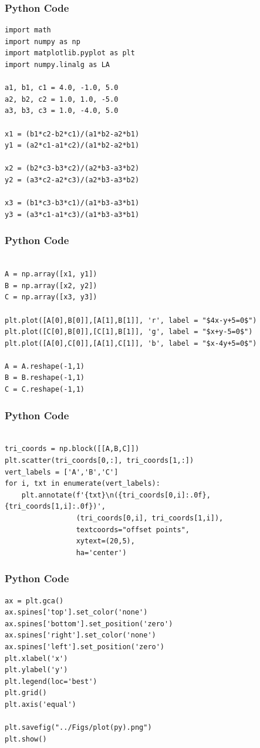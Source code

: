 \documentclass{beamer}
\begin{document}


\begin{frame}[fragile]
    \frametitle{Python Code}
    \begin{lstlisting}
import math
import numpy as np
import matplotlib.pyplot as plt
import numpy.linalg as LA

a1, b1, c1 = 4.0, -1.0, 5.0
a2, b2, c2 = 1.0, 1.0, -5.0
a3, b3, c3 = 1.0, -4.0, 5.0

x1 = (b1*c2-b2*c1)/(a1*b2-a2*b1)
y1 = (a2*c1-a1*c2)/(a1*b2-a2*b1)

x2 = (b2*c3-b3*c2)/(a2*b3-a3*b2) 
y2 = (a3*c2-a2*c3)/(a2*b3-a3*b2)

x3 = (b1*c3-b3*c1)/(a1*b3-a3*b1)
y3 = (a3*c1-a1*c3)/(a1*b3-a3*b1)

\end{lstlisting}
\end{frame}

\begin{frame}[fragile]
    \frametitle{Python Code}
    \begin{lstlisting}

A = np.array([x1, y1])
B = np.array([x2, y2])
C = np.array([x3, y3])

plt.plot([A[0],B[0]],[A[1],B[1]], 'r', label = "$4x-y+5=0$")
plt.plot([C[0],B[0]],[C[1],B[1]], 'g', label = "$x+y-5=0$")
plt.plot([A[0],C[0]],[A[1],C[1]], 'b', label = "$x-4y+5=0$")

A = A.reshape(-1,1)
B = B.reshape(-1,1)
C = C.reshape(-1,1)

\end{lstlisting}
\end{frame}

\begin{frame}[fragile]
    \frametitle{Python Code}
    \begin{lstlisting}

tri_coords = np.block([[A,B,C]])
plt.scatter(tri_coords[0,:], tri_coords[1,:])
vert_labels = ['A','B','C']
for i, txt in enumerate(vert_labels):
    plt.annotate(f'{txt}\n({tri_coords[0,i]:.0f}, {tri_coords[1,i]:.0f})',
                 (tri_coords[0,i], tri_coords[1,i]), 
                 textcoords="offset points", 
                 xytext=(20,5), 
                 ha='center') 

\end{lstlisting}
\end{frame}

\begin{frame}[fragile]
    \frametitle{Python Code}
    \begin{lstlisting}
ax = plt.gca()
ax.spines['top'].set_color('none')
ax.spines['bottom'].set_position('zero')
ax.spines['right'].set_color('none')
ax.spines['left'].set_position('zero')
plt.xlabel('x')
plt.ylabel('y')
plt.legend(loc='best')
plt.grid()
plt.axis('equal')

plt.savefig("../Figs/plot(py).png")
plt.show()



    \end{lstlisting}
\end{frame}
\end{document}
